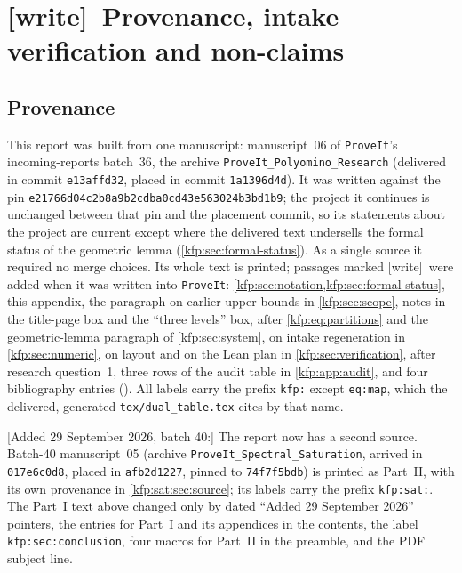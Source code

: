 \documentclass[11pt,a4paper]{article}
\theoremstyle{definition}
\theoremstyle{remark}
\newcommand{\repo}{\texttt{ProveIt}}
\newcommand{\sha}{\texttt{e21766d04c2b8a9b2cdba0cd43e563024b3bd1b9}}
\newcommand{\wtag}{\textsf{\small[write]}}
\begin{document}
\section{\wtag\ Provenance, intake verification and non-claims}
\label{kfp:app:provenance}

\subsection{Provenance}
This report was built from one manuscript: manuscript~06 of \repo's
incoming-reports batch~36, the archive \texttt{ProveIt\_Polyomino\_Research}
(delivered in commit \texttt{e13affd32}, placed in commit
\texttt{1a1396d4d}). It was written against the pin \sha; the project it
continues is unchanged between that pin and the placement commit, so its
statements about the project are current except where the delivered text
undersells the formal status of the geometric lemma
(\cref{kfp:sec:formal-status}). As a single source it required no merge
choices. Its whole text is printed; passages marked \wtag\ were added when it
was written into \repo:
\cref{kfp:sec:notation,kfp:sec:formal-status}, this appendix, the paragraph
on earlier upper bounds in \cref{kfp:sec:scope}, notes in the title-page box
and the ``three levels'' box, after \eqref{kfp:eq:partitions} and the
geometric-lemma paragraph of \cref{kfp:sec:system}, on intake regeneration in
\cref{kfp:sec:numeric}, on layout and on the Lean plan in
\cref{kfp:sec:verification}, after research question~1, three rows of the
audit table in \cref{kfp:app:audit}, and four bibliography entries
(\cite{repobound,eden,klarnerrivest,barequetshalah}). All labels carry the
prefix \texttt{kfp:} except \texttt{eq:map}, which the delivered, generated
\texttt{tex/dual\_table.tex} cites by that name.

[Added 29 September 2026, batch 40:] The report now has a second source.
Batch-40 manuscript~05 (archive \texttt{ProveIt\_Spectral\_Saturation},
arrived in \texttt{017e6c0d8}, placed in \texttt{afb2d1227}, pinned to
\texttt{74f7f5bdb}) is printed as Part~II, with its own provenance in
\cref{kfp:sat:sec:source}; its labels carry the prefix \texttt{kfp:sat:}.
The Part~I text above changed only by dated ``Added 29 September 2026''
pointers, the entries for Part~I and its appendices in the contents, the
label \texttt{kfp:sec:conclusion}, four macros for Part~II in the preamble,
and the PDF subject line.
\end{document}
